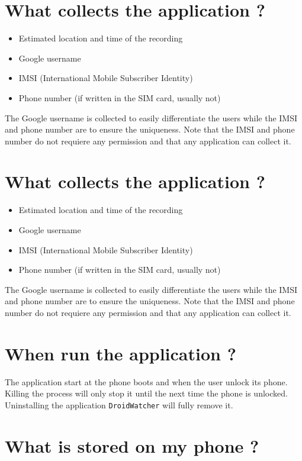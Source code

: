 \section{What collects the application ?}

\begin{itemize}
\item Estimated location and time of the recording
\item Google username
\item IMSI (International Mobile Subscriber Identity)
\item Phone number (if written in the SIM card, usually not)
\end{itemize}

The Google username is collected to easily differentiate the users while the IMSI and phone number are to ensure the uniqueness.
Note that the IMSI and phone number do not requiere any permission and that any application can collect it.

\section{What collects the application ?}

\begin{itemize}
\item Estimated location and time of the recording
\item Google username
\item IMSI (International Mobile Subscriber Identity)
\item Phone number (if written in the SIM card, usually not)
\end{itemize}

The Google username is collected to easily differentiate the users while the IMSI and phone number are to ensure the uniqueness.
Note that the IMSI and phone number do not requiere any permission and that any application can collect it.

\section{When run the application ?}

The application start at the phone boots and when the user unlock its phone. Killing the process will only stop it until the next time the phone is unlocked. Uninstalling the application \texttt{DroidWatcher} will fully remove it.

\section{What is stored on my phone ?}


